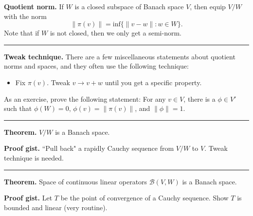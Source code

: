 \documentclass[12pt, letterpaper]{article}
\newcommand{\cB}{{\mathcal B}}
\begin{document}
\pagestyle{fancy}
\textbf{Quotient norm.} If $W$ is a closed subspace of Banach space $V$, then equip $V/W$ with the norm
\[
    \|\pi(v)\| = \text{inf}\{\|v-w\|: w \in W\}.
\]
Note that if $W$ is not closed, then we only get a semi-norm.

\noindent\rule{\textwidth}{1pt}
\textbf{Tweak technique.} There are a few miscellaneous statements about quotient norms and spaces, and they often use the following technique:
\begin{itemize}
    \item Fix $\pi(v)$. Tweak $v \rightarrow v + w$ until you get a specific property.
\end{itemize}
As an exercise, prove the following statement: For any $v \in V$, there is a $\phi \in V'$ such that $\phi(W) = 0$, $\phi(v) = \|\pi(v)\|$, and $\|\phi\| = 1$.

\noindent\rule{\textwidth}{1pt}
\textbf{Theorem.} $V/W$ is a Banach space.

\textbf{Proof gist.} ``Pull back" a rapidly Cauchy sequence from $V/W$ to $V$. Tweak technique is needed.

\noindent\rule{\textwidth}{1pt}
\textbf{Theorem.} Space of continuous linear operators $\cB(V, W)$ is a Banach space.

\textbf{Proof gist.} Let $T$ be the point of convergence of a Cauchy sequence. Show $T$ is bounded and linear (very routine).
\end{document}
